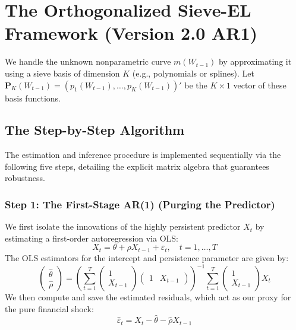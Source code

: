 \documentclass{article}
\begin{document}
\section{The Orthogonalized Sieve-EL Framework (Version 2.0 AR1)}

We handle the unknown nonparametric curve $m(W_{t-1})$ by approximating it using a sieve basis of dimension $K$ (e.g., polynomials or splines). Let $\bm{P}_K(W_{t-1}) = (p_1(W_{t-1}), \dots, p_K(W_{t-1}))'$ be the $K \times 1$ vector of these basis functions.

\subsection{The Step-by-Step Algorithm}

The estimation and inference procedure is implemented sequentially via the following five steps, detailing the explicit matrix algebra that guarantees robustness.

\subsubsection*{Step 1: The First-Stage AR(1) (Purging the Predictor)}
We first isolate the innovations of the highly persistent predictor $X_t$ by estimating a first-order autoregression via OLS:
\begin{equation}
    X_t = \theta + \rho X_{t-1} + \varepsilon_t, \quad t=1,\dots,T
\end{equation}
The OLS estimators for the intercept and persistence parameter are given by:
\begin{equation}
    \begin{pmatrix} \widehat{\theta} \\ \widehat{\rho} \end{pmatrix} = \left( \sum_{t=1}^T \begin{pmatrix} 1 \\ X_{t-1} \end{pmatrix} \begin{pmatrix} 1 & X_{t-1} \end{pmatrix} \right)^{-1} \sum_{t=1}^T \begin{pmatrix} 1 \\ X_{t-1} \end{pmatrix} X_t
\end{equation}
We then compute and save the estimated residuals, which act as our proxy for the pure financial shock:
\begin{equation}
    \widehat{\varepsilon}_t = X_t - \widehat{\theta} - \widehat{\rho} X_{t-1}
\end{equation}
\end{document}
